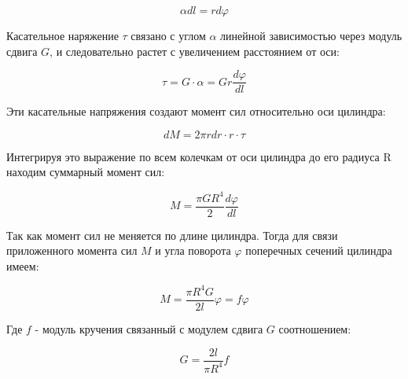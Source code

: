 \documentclass[a4paper, 12pt]{article}
\begin{document}
    \bigskip
    
    \begin{equation}
        \alpha dl= r d\varphi 
    \end{equation}

    \bigskip

    Касательное наряжение $\tau $ связано с углом $\alpha$ линейной зависимостью через модуль сдвига $G$, и следовательно растет с увеличением расстоянием от оси:

    \bigskip
    
    \begin{equation}
        \tau = G\cdot \alpha =Gr\frac{d\varphi}{dl} 
    \end{equation}

    \bigskip

    Эти касательные напряжения создают момент сил относительно оси цилиндра:


    \bigskip

    \begin{equation}
        dM=2\pi r dr \cdot r\cdot \tau  
    \end{equation}

    \bigskip
    
    Интегрируя это выражение по всем колечкам от оси цилиндра до его радиуса R находим суммарный
    момент сил:

    \bigskip

    \begin{equation}
        M = \frac{\pi G R^{4}}{2} \frac{d \varphi }{d l} 
    \end{equation}

    \bigskip

    Так как момент сил не меняется по длине цилиндра. Тогда для связи приложенного
    момента сил $M$ и угла поворота $\varphi$ поперечных сечений цилиндра имеем:

    \bigskip

    \begin{equation}
        M=\frac{\pi R^{4}G}{2l}\varphi=f \varphi
    \end{equation}

    \bigskip

    Где $f$ - модуль кручения связанный с модулем сдвига $G$ соотношением:

    \bigskip
    
    \begin{equation}
        G=\frac{2l}{\pi R^{4}}f
    \end{equation}
\end{document}
